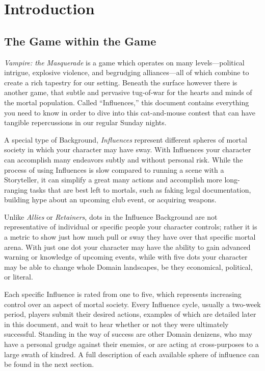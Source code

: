 \section{Introduction}
\subsection{The Game within the Game}
\emph{Vampire: the Masquerade} is a game which operates on many levels---political intrigue, 
explosive violence, and begrudging alliances---all of which combine to create a rich tapestry 
for our setting.  Beneath the surface however there is another game, that subtle and pervasive 
tug-of-war for the hearts and minds of the mortal population.  Called ``Influences,'' this 
document contains everything you need to know in order to dive into this cat-and-mouse contest 
that can have tangible repercussions in our regular Sunday nights.

A special type of Background, \emph{Influences} represent different spheres of mortal society 
in which your character may have sway.  With Influences your character can accomplish many 
endeavors subtly and without personal risk.  While the process of using Influences is slow 
compared to running a scene with a Storyteller, it can simplify a great many actions and 
accomplish more long-ranging tasks that are best left to mortals, such as faking legal documentation, 
building hype about an upcoming club event, or acquiring weapons.

Unlike \emph{Allies} or \emph{Retainers}, dots in the Influence Background are not representative 
of individual or specific people your character controls; rather it is a metric to show just how 
much pull or sway they have over that specific mortal arena.  With just one dot your character may 
have the ability to gain advanced warning or knowledge of upcoming events, while with five dots 
your character may be able to change whole Domain landscapes, be they economical, political, or literal.

Each specific Influence is rated from one to five, which represents increasing control over an aspect 
of mortal society.  Every Influence cycle, usually a two-week period, players submit their 
desired actions, examples of which are detailed later in this document, and wait to hear 
whether or not they were ultimately successful.  Standing in the way of success are other 
Domain denizens, who may have a personal grudge against their enemies, or are acting at cross-purposes 
to a large swath of kindred.  A full description of each available sphere of influence can be found 
in the next section.

